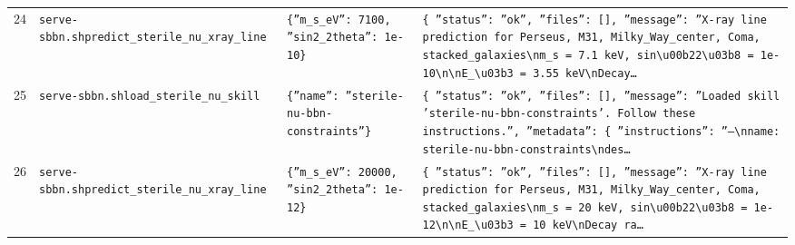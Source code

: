\documentclass[11pt,a4paper]{article}
\begin{document}
\begin{longtable}{@{}p{}p{}p{}p{}@{}}
24 & \texttt{serve-sbbn.sh}\newline\texttt{predict\_\allowbreak{}sterile\_\allowbreak{}nu\_\allowbreak{}xray\_\allowbreak{}line} & \texttt{\{''m\_\allowbreak{}s\_\allowbreak{}eV'':\allowbreak{} 7100,\allowbreak{} ''sin2\_\allowbreak{}2theta'':\allowbreak{} 1e-10\}\allowbreak{}} & \texttt{\{   ''status'':\allowbreak{} ''ok'',\allowbreak{}   ''files'':\allowbreak{} []\allowbreak{},\allowbreak{}   ''message'':\allowbreak{} ''X-ray line prediction for Perseus,\allowbreak{} M31,\allowbreak{} Milky\_\allowbreak{}Way\_\allowbreak{}center,\allowbreak{} Coma,\allowbreak{} stacked\_\allowbreak{}galaxies\textbackslash{}\allowbreak{}nm\_\allowbreak{}s =\allowbreak{} 7.1 keV,\allowbreak{} sin\textbackslash{}\allowbreak{}u00b22\textbackslash{}\allowbreak{}u03b8 =\allowbreak{} 1e-10\textbackslash{}\allowbreak{}n\textbackslash{}\allowbreak{}nE\_\allowbreak{}\textbackslash{}\allowbreak{}u03b3 =\allowbreak{} 3.55 keV\textbackslash{}\allowbreak{}nDecay\ldots{}\allowbreak{}} \\
25 & \texttt{serve-sbbn.sh}\newline\texttt{load\_\allowbreak{}sterile\_\allowbreak{}nu\_\allowbreak{}skill} & \texttt{\{''name'':\allowbreak{} ''sterile-nu-bbn-constraints''\}\allowbreak{}} & \texttt{\{   ''status'':\allowbreak{} ''ok'',\allowbreak{}   ''files'':\allowbreak{} []\allowbreak{},\allowbreak{}   ''message'':\allowbreak{} ''Loaded skill 'sterile-nu-bbn-constraints'. Follow these instructions.'',\allowbreak{}   ''metadata'':\allowbreak{} \{     ''instructions'':\allowbreak{} ''---\textbackslash{}\allowbreak{}nname:\allowbreak{} sterile-nu-bbn-constraints\textbackslash{}\allowbreak{}ndes\ldots{}\allowbreak{}} \\
26 & \texttt{serve-sbbn.sh}\newline\texttt{predict\_\allowbreak{}sterile\_\allowbreak{}nu\_\allowbreak{}xray\_\allowbreak{}line} & \texttt{\{''m\_\allowbreak{}s\_\allowbreak{}eV'':\allowbreak{} 20000,\allowbreak{} ''sin2\_\allowbreak{}2theta'':\allowbreak{} 1e-12\}\allowbreak{}} & \texttt{\{   ''status'':\allowbreak{} ''ok'',\allowbreak{}   ''files'':\allowbreak{} []\allowbreak{},\allowbreak{}   ''message'':\allowbreak{} ''X-ray line prediction for Perseus,\allowbreak{} M31,\allowbreak{} Milky\_\allowbreak{}Way\_\allowbreak{}center,\allowbreak{} Coma,\allowbreak{} stacked\_\allowbreak{}galaxies\textbackslash{}\allowbreak{}nm\_\allowbreak{}s =\allowbreak{} 20 keV,\allowbreak{} sin\textbackslash{}\allowbreak{}u00b22\textbackslash{}\allowbreak{}u03b8 =\allowbreak{} 1e-12\textbackslash{}\allowbreak{}n\textbackslash{}\allowbreak{}nE\_\allowbreak{}\textbackslash{}\allowbreak{}u03b3 =\allowbreak{} 10 keV\textbackslash{}\allowbreak{}nDecay ra\ldots{}\allowbreak{}} \\

\end{longtable}
\end{document}

